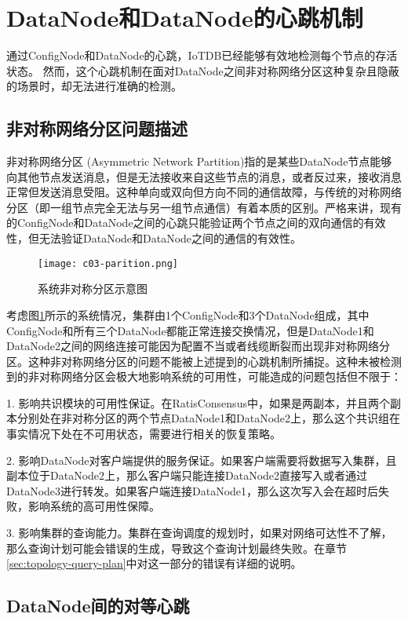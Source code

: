 \section{DataNode和DataNode的心跳机制}


通过ConfigNode和DataNode的心跳，IoTDB已经能够有效地检测每个节点的存活状态。
然而，这个心跳机制在面对DataNode之间非对称网络分区这种复杂且隐蔽的场景时，却无法进行准确的检测。

\subsection{非对称网络分区问题描述}
非对称网络分区 (Asymmetric Network Partition)指的是某些DataNode节点能够向其他节点发送消息，但是无法接收来自这些节点的消息，或者反过来，接收消息正常但发送消息受阻。这种单向或双向但方向不同的通信故障，与传统的对称网络分区（即一组节点完全无法与另一组节点通信）有着本质的区别。严格来讲，现有的ConfigNode和DataNode之间的心跳只能验证两个节点之间的双向通信的有效性，但无法验证DataNode和DataNode之间的通信的有效性。

\begin{figure}
  \centering
  \texttt{[image: c03-parition.png]}
  \caption{系统非对称分区示意图}
  \label{fig:c03-partition}
\end{figure}

考虑图\ref{fig:c03-partition}所示的系统情况，集群由1个ConfigNode和3个DataNode组成，其中ConfigNode和所有三个DataNode都能正常连接交换情况，但是DataNode1和DataNode2之间的网络连接可能因为配置不当或者线缆断裂而出现非对称网络分区。这种非对称网络分区的问题不能被上述提到的心跳机制所捕捉。这种未被检测到的非对称网络分区会极大地影响系统的可用性，可能造成的问题包括但不限于：

1. 影响共识模块的可用性保证。在RatisConsensus中，如果是两副本，并且两个副本分别处在非对称分区的两个节点DataNode1和DataNode2上，那么这个共识组在事实情况下处在不可用状态，需要进行相关的恢复策略。

2. 影响DataNode对客户端提供的服务保证。如果客户端需要将数据写入集群，且副本位于DataNode2上，那么客户端只能连接DataNode2直接写入或者通过DataNode3进行转发。如果客户端连接DataNode1，那么这次写入会在超时后失败，影响系统的高可用性保障。

3. 影响集群的查询能力。集群在查询调度的规划时，如果对网络可达性不了解，那么查询计划可能会错误的生成，导致这个查询计划最终失败。在章节\ref{sec:topology-query-plan}中对这一部分的错误有详细的说明。

\subsection{DataNode间的对等心跳}\label{sec:datanode-intra-heartbeat}

